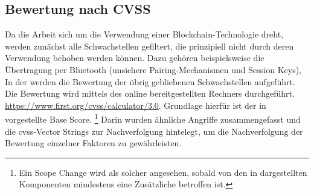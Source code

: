 \subsection{Bewertung nach CVSS}
\label{sec:analysis_cvss}
    Da die Arbeit sich um die Verwendung einer Blockchain-Technologie dreht, werden zunächst alle Schwachstellen gefiltert, die prinzipiell nicht durch deren Verwendung behoben werden können.
    Dazu gehören beispielsweise die Übertragung per Bluetooth (unsichere Pairing-Mechanismen und Session Keys), 
    In der  werden die Bewertung der übrig gebliebenen Schwachstellen aufgeführt.
    Die Bewertung wird mittels des online bereitgestellten Rechners durchgeführt. \url{https://www.first.org/cvss/calculator/3.0}.
	Grundlage hierfür ist der in  vorgestellte Base Score.
	\footnote{Ein Scope Change wird als solcher angesehen, sobald von den in  dargestellten Komponenten mindestens eine Zusätzliche betroffen ist.}
	Darin wurden ähnliche Angriffe zusammengefasst und die \gls{cvss}-Vector Strings zur Nachverfolgung hintelegt, um die Nachverfolgung der Bewertung einzelner Faktoren zu gewährleisten.
	
